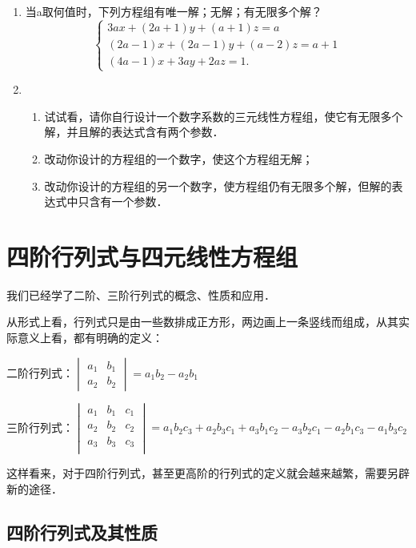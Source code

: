 \begin{enumerate}
\item 当a取何值时，下列方程组有唯一解；无解；有无限多个解？
\[\begin{cases}
    3ax+ (2a+1) y+ (a+1) z=a\\
    (2a-1) x+ (2a-1) y+ (a-2) z=a+1\\
    (4a-1) x+3ay+2az=1.
\end{cases}\]

\item \begin{enumerate}
    \item 试试看，请你自行设计一个数字系数的三元线性方程组，使它有无限多个解，并且解的表达式含有两个参数．
    \item 改动你设计的方程组的一个数字，使这个方程组无解；
    \item 改动你设计的方程组的另一个数字，使方程组仍有无限多个解，但解的表达式中只含有一个参数．
\end{enumerate}
\end{enumerate}


\section{四阶行列式与四元线性方程组}

我们已经学了二阶、三阶行列式的概念、性质和应用．

从形式上看，行列式只是由一些数排成正方形，两边画上一条竖线而组成，从其实际意义上看，都有明确的定义：

二阶行列式：$\begin{vmatrix}
    a_1&b_1\\a_2&b_2
\end{vmatrix}=a_1b_2-a_2b_1$

三阶行列式：$\begin{vmatrix}
a_1&b_1&c_1\\a_2&b_2&c_2\\a_3&b_3&c_3\\
\end{vmatrix}=a_1b_2c_3+a_2b_3c_1+a_3b_1c_2-a_3b_2c_1-a_2b_1c_3-a_1b_3c_2$

这样看来，对于四阶行列式，甚至更高阶的行列式的定义就会越来越繁，需要另辟新的途径．

\subsection{四阶行列式及其性质}

